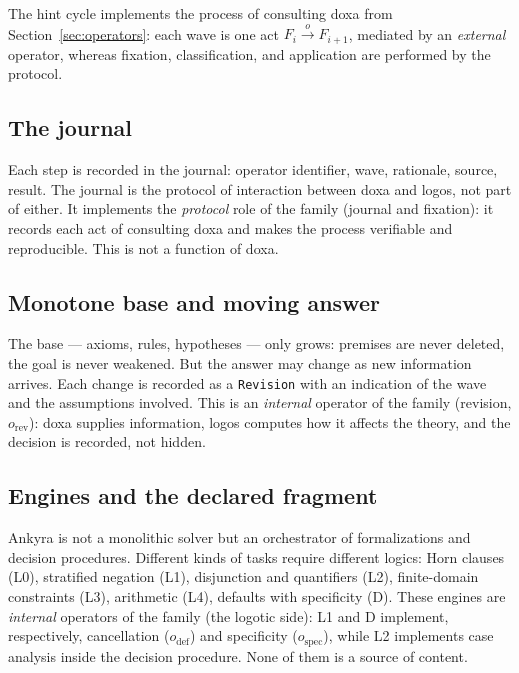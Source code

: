 \documentclass[12pt,a4paper]{article}
\begin{document}
The hint cycle implements the process of consulting doxa from
Section~\ref{sec:operators}: each wave is one act
$F_i \xrightarrow{o} F_{i+1}$, mediated by an \emph{external} operator,
whereas fixation, classification, and application are performed by the
protocol.

\subsection{The journal}
\label{sec:journal}

Each step is recorded in the journal: operator identifier, wave, rationale,
source, result. The journal is the protocol of interaction between doxa and
logos, not part of either. It implements the \emph{protocol} role of the
family (journal and fixation): it records each act of consulting doxa and
makes the process verifiable and reproducible. This is not a function of doxa.

\subsection{Monotone base and moving answer}
\label{sec:revision}

The base --- axioms, rules, hypotheses --- only grows: premises are never
deleted, the goal is never weakened. But the answer may change as new
information arrives. Each change is recorded as a \texttt{Revision} with an
indication of the wave and the assumptions involved. This is an
\emph{internal} operator of the family (revision, $o_{\text{rev}}$): doxa
supplies information, logos computes how it affects the theory, and the
decision is recorded, not hidden.

\subsection{Engines and the declared fragment}
\label{sec:engines}

Ankyra is not a monolithic solver but an orchestrator of formalizations and
decision procedures. Different kinds of tasks require different logics: Horn
clauses (L0), stratified negation (L1), disjunction and quantifiers (L2),
finite-domain constraints (L3), arithmetic (L4), defaults with specificity
(D). These engines are \emph{internal} operators of the family (the logotic
side): L1 and D implement, respectively, cancellation ($o_{\text{def}}$) and
specificity ($o_{\text{spec}}$), while L2 implements case analysis inside the
decision procedure. None of them is a source of content.
\end{document}
